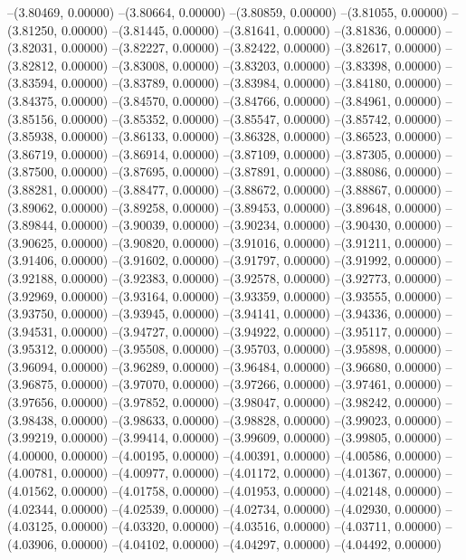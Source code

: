 --(3.80469, 0.00000)
--(3.80664, 0.00000)
--(3.80859, 0.00000)
--(3.81055, 0.00000)
--(3.81250, 0.00000)
--(3.81445, 0.00000)
--(3.81641, 0.00000)
--(3.81836, 0.00000)
--(3.82031, 0.00000)
--(3.82227, 0.00000)
--(3.82422, 0.00000)
--(3.82617, 0.00000)
--(3.82812, 0.00000)
--(3.83008, 0.00000)
--(3.83203, 0.00000)
--(3.83398, 0.00000)
--(3.83594, 0.00000)
--(3.83789, 0.00000)
--(3.83984, 0.00000)
--(3.84180, 0.00000)
--(3.84375, 0.00000)
--(3.84570, 0.00000)
--(3.84766, 0.00000)
--(3.84961, 0.00000)
--(3.85156, 0.00000)
--(3.85352, 0.00000)
--(3.85547, 0.00000)
--(3.85742, 0.00000)
--(3.85938, 0.00000)
--(3.86133, 0.00000)
--(3.86328, 0.00000)
--(3.86523, 0.00000)
--(3.86719, 0.00000)
--(3.86914, 0.00000)
--(3.87109, 0.00000)
--(3.87305, 0.00000)
--(3.87500, 0.00000)
--(3.87695, 0.00000)
--(3.87891, 0.00000)
--(3.88086, 0.00000)
--(3.88281, 0.00000)
--(3.88477, 0.00000)
--(3.88672, 0.00000)
--(3.88867, 0.00000)
--(3.89062, 0.00000)
--(3.89258, 0.00000)
--(3.89453, 0.00000)
--(3.89648, 0.00000)
--(3.89844, 0.00000)
--(3.90039, 0.00000)
--(3.90234, 0.00000)
--(3.90430, 0.00000)
--(3.90625, 0.00000)
--(3.90820, 0.00000)
--(3.91016, 0.00000)
--(3.91211, 0.00000)
--(3.91406, 0.00000)
--(3.91602, 0.00000)
--(3.91797, 0.00000)
--(3.91992, 0.00000)
--(3.92188, 0.00000)
--(3.92383, 0.00000)
--(3.92578, 0.00000)
--(3.92773, 0.00000)
--(3.92969, 0.00000)
--(3.93164, 0.00000)
--(3.93359, 0.00000)
--(3.93555, 0.00000)
--(3.93750, 0.00000)
--(3.93945, 0.00000)
--(3.94141, 0.00000)
--(3.94336, 0.00000)
--(3.94531, 0.00000)
--(3.94727, 0.00000)
--(3.94922, 0.00000)
--(3.95117, 0.00000)
--(3.95312, 0.00000)
--(3.95508, 0.00000)
--(3.95703, 0.00000)
--(3.95898, 0.00000)
--(3.96094, 0.00000)
--(3.96289, 0.00000)
--(3.96484, 0.00000)
--(3.96680, 0.00000)
--(3.96875, 0.00000)
--(3.97070, 0.00000)
--(3.97266, 0.00000)
--(3.97461, 0.00000)
--(3.97656, 0.00000)
--(3.97852, 0.00000)
--(3.98047, 0.00000)
--(3.98242, 0.00000)
--(3.98438, 0.00000)
--(3.98633, 0.00000)
--(3.98828, 0.00000)
--(3.99023, 0.00000)
--(3.99219, 0.00000)
--(3.99414, 0.00000)
--(3.99609, 0.00000)
--(3.99805, 0.00000)
--(4.00000, 0.00000)
--(4.00195, 0.00000)
--(4.00391, 0.00000)
--(4.00586, 0.00000)
--(4.00781, 0.00000)
--(4.00977, 0.00000)
--(4.01172, 0.00000)
--(4.01367, 0.00000)
--(4.01562, 0.00000)
--(4.01758, 0.00000)
--(4.01953, 0.00000)
--(4.02148, 0.00000)
--(4.02344, 0.00000)
--(4.02539, 0.00000)
--(4.02734, 0.00000)
--(4.02930, 0.00000)
--(4.03125, 0.00000)
--(4.03320, 0.00000)
--(4.03516, 0.00000)
--(4.03711, 0.00000)
--(4.03906, 0.00000)
--(4.04102, 0.00000)
--(4.04297, 0.00000)
--(4.04492, 0.00000)
